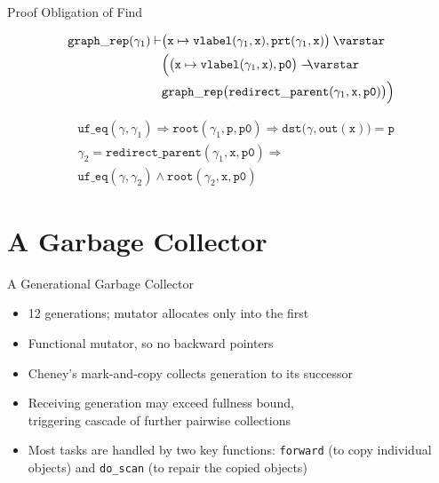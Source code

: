 \documentclass[professionalfonts, xcolor=table]{beamer}
\newcommand{\scon}{\mathbin{\varstar}}
\newcommand{\wand}{%
 \mathrel{\mbox{$\hspace*{-0.03em}\mathord{-}\hspace*{-0.66em}
  \mathord{-}\hspace*{-0.36em}\mathord{\scon}$\hspace*{-0.005em}}}}
\begin{document}
\begin{frame}{Proof Obligation of Find}
  \centering
  \colorbox{lightg}{\parbox{.9\textwidth}{
  \begin{align*}
    \mathtt{graph\_rep}(\gamma_1) \vdash & \big(\mathtt{x}\mapsto
    \mathtt{vlabel}(\gamma_1, \mathtt{x}), \mathtt{prt}(\gamma_1, \mathtt{x})\big)
    \scon \null\\
    & \Big(\big(\mathtt{x}\mapsto \mathtt{vlabel}(\gamma_1, \mathtt{x}),
    \mathtt{p0}\big) \wand \null\\
    & \mathtt{graph\_rep}\big(\mathtt{redirect\_parent}(\gamma_1,\mathtt{x},
    \mathtt{p0})\big)\Big)
  \end{align*}}}
  \pause
  \vskip15pt
  \colorbox{lightg}{\parbox{.9\textwidth}{
  \begin{align*}
    & \mathtt{uf\_eq}(\gamma, \gamma_1) \Rightarrow \mathtt{root}(\gamma_1, \mathtt{p},
    \mathtt{p0}) \Rightarrow \mathtt{dst}\big(\gamma, \mathtt{out}(\mathtt{x})\big)=
    \mathtt{p}\\
    & \gamma_2=\mathtt{redirect\_parent}(\gamma_1,\mathtt{x},\mathtt{p0}) \Rightarrow\\
    & \mathtt{uf\_eq}(\gamma, \gamma_2) \wedge \mathtt{root}(\gamma_2, \mathtt{x},
    \mathtt{p0})
  \end{align*}}}
\end{frame}

\section{A Garbage Collector}

\begin{frame}{A Generational Garbage Collector}
  \begin{itemize}
  \item 12 generations; mutator allocates only into the first
  \item Functional mutator, so no backward pointers
  \pause
  \item Cheney's mark-and-copy collects generation to its successor
  \item Receiving generation may exceed fullness bound, \\
  triggering cascade of further pairwise collections
  \pause
  \item Most tasks are handled by two key functions: \texttt{forward} (to copy
  individual objects) and \texttt{do\_scan} (to repair the copied objects)
  \end{itemize}
\end{frame}
\end{document}

